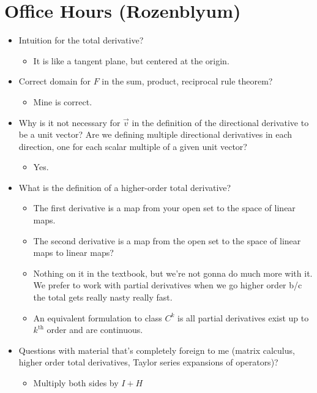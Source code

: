 \documentclass[../notes.tex]{subfiles}
\begin{document}
\section{Office Hours (Rozenblyum)}
\begin{itemize}
    \item {}Intuition for the total derivative?
    \begin{itemize}
        \item It is like a tangent plane, but centered at the origin.
    \end{itemize}
    \item Correct domain for $F$ in the sum, product, reciprocal rule theorem?
    \begin{itemize}
        \item Mine is correct.
    \end{itemize}
    \item Why is it not necessary for $\vec{v}$ in the definition of the directional derivative to be a unit vector? Are we defining multiple directional derivatives in each direction, one for each scalar multiple of a given unit vector?
    \begin{itemize}
        \item Yes.
    \end{itemize}
    \item What is the definition of a higher-order total derivative?
    \begin{itemize}
        \item The first derivative is a map from your open set to the space of linear maps.
        \item The second derivative is a map from the open set to the space of linear maps to linear maps?
        \item Nothing on it in the textbook, but we're not gonna do much more with it. We prefer to work with partial derivatives when we go higher order b/c the total gets really nasty really fast.
        \item An equivalent formulation to class $C^k$ is all partial derivatives exist up to $k^\text{th}$ order and are continuous.
    \end{itemize}
    \item Questions with material that's completely foreign to me (matrix calculus, higher order total derivatives, Taylor series expansions of operators)?
    \begin{itemize}
        \item Multiply both sides by $I+H$

\end{itemize}
\end{itemize}
\end{document}
